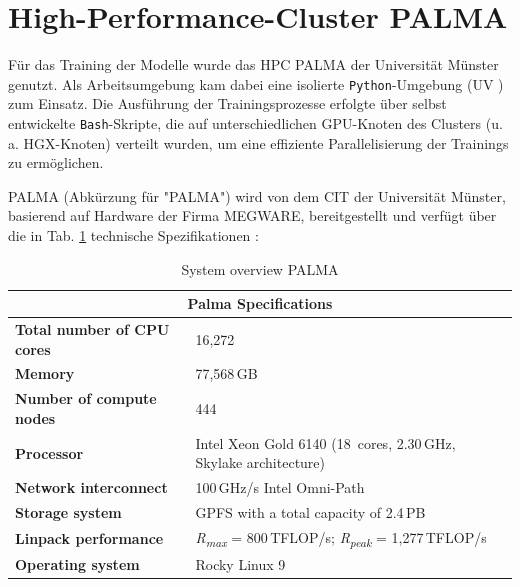 \section{High-Performance-Cluster PALMA}

Für das Training der Modelle wurde das \acrfull{HPC} \Acrshort{PALMA} der Universität Münster genutzt. Als Arbeitsumgebung kam dabei eine isolierte \texttt{Python}-Umgebung (UV \cite{palma_uv}) zum Einsatz. Die Ausführung der Trainingsprozesse erfolgte über selbst entwickelte \texttt{Bash}-Skripte, die auf unterschiedlichen \acrshort{GPU}-Knoten des Clusters (u.\,a. HGX-Knoten) verteilt wurden, um eine effiziente Parallelisierung der Trainings zu ermöglichen.

PALMA (Abkürzung für "\Acrlong{PALMA}") wird von dem \Acrfull{CIT} der Universität Münster, basierend auf Hardware der Firma MEGWARE, bereitgestellt \cite{palma_spec} und verfügt über die in Tab. \ref{tab:Spec_Palma} technische Spezifikationen \cite{palma_spec}:



\begin{table}[h!]
\centering
\begin{tabular}{ll}
\multicolumn{2}{c}{\textbf{Palma Specifications}} \\ \hline
\textbf{Total number of \acrshort{CPU} cores} & 16,272 \\
\textbf{Memory} & 77,568\,\acrshort{GB} \\
\textbf{Number of compute nodes} & 444 \\
\textbf{Processor} & Intel Xeon Gold 6140 (18~cores, 2.30\,\acrshort{GHz}, Skylake architecture) \\
\textbf{Network interconnect} & 100\,\acrshort{GHz}/s Intel Omni-Path \\
\textbf{Storage system} & \acrshort{GPFS} with a total capacity of 2.4\,\acrshort{PB} \\
\textbf{Linpack performance} & \textit{R\textsubscript{max}} = 800\,\acrshort{TFLOP}/s; \textit{R\textsubscript{peak}} = 1,277\,\acrshort{TFLOP}/s \\
\textbf{Operating system} & Rocky Linux 9 \\
\hline
\end{tabular}
\caption{System overview PALMA}
\label{tab:Spec_Palma}
\end{table}

